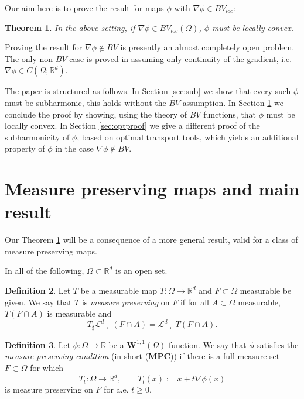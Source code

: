 \documentclass[11pt, twoside, reqno]{amsart}
\newcounter{assu}
\theoremstyle{definition} \newtheorem{definition}{Definition}[section]
\theoremstyle{definition} \newtheorem{remark}[definition]{Remark}
\theoremstyle{plain} \newtheorem{lemma}[definition]{Lemma}
\theoremstyle{plain} \newtheorem{proposition}[definition]{Proposition}
\theoremstyle{plain} \newtheorem{theorem}[definition]{Theorem}
\theoremstyle{plain} \newtheorem{corollary}[definition]{Corollary}
\theoremstyle{definition} \newtheorem{example}[definition]{Example}
\theoremstyle{plain} \newtheorem{claim}[clai]{Claim}
\theoremstyle{definition} \newtheorem{assumption}[definition]{Assumption}
\newcommand{\1}{\mathbbm 1}
\numberwithin{equation}{section} %
\theoremstyle{plain} \newtheorem*{theorem*}{Theorem}
\theoremstyle{plain} \newtheorem{mthm}[maintheorem]{Main Theorem}
\theoremstyle{plain} \newtheorem*{mthm*}{Main Theorem}
\theoremstyle{plain} \newtheorem*{conjecture*}{Conjecture}
\theoremstyle{plain} \newtheorem{conjecture}[definition]{Conjecture}
\theoremstyle{plain} \newtheorem*{problem*}{Problem}
\begin{document}
\vspace{0.3cm}
Our aim here is to prove the result for maps $\phi$ with $\nabla \phi \in BV_{loc}$:
\begin{theorem}\label{thm:mainthm}
    In the above setting, if $\nabla \phi \in BV_{loc}(\Omega)$, $\phi$ must be locally convex.
\end{theorem}

\vspace{0.3cm}
Proving the result for $\nabla \phi \notin BV$ is presently an almost completely open problem. The only non-$BV$ case is proved in \cite{LP25} assuming only continuity of the gradient, i.e. $\nabla \phi \in C(\Omega; \mathbb R^d)$.

\vspace{0.3cm}
The paper is structured as follows. In Section \ref{sec:sub} we show that every such $\phi$ must be subharmonic, this holds without the $BV$ assumption.  In Section \ref{sec:main} we conclude the proof by showing, using the theory of $BV$ functions, that $\phi$ must be locally convex. In Section \ref{sec:optproof} we give a different proof of the subharmonicity of $\phi$, based on optimal transport tools, which yields an additional property of $\phi$ in the case $\nabla \phi \notin BV$.

\section{Measure preserving maps and main result}\label{sec:main}
Our Theorem \ref{thm:mainthm} will be a consequence of a more general result, valid for a class of measure preserving maps.

In all of the following,  $\Omega \subset \mathbb R^d$ is an open set.

\begin{definition}
Let $T$ be a measurable map $T : \Omega \to \mathbb R^d$ and $F \subset \Omega$ measurable be given. We say that $T$ is \emph{measure preserving} on $F$ if for all $A\subset \Omega$ measurable, $T(F \cap A)$ is measurable and
\begin{equation}\label{eq:mp}
    T_\sharp \mathscr L^d \llcorner (F\cap A) = \mathscr L^d \llcorner T(F\cap A).
\end{equation}
\end{definition}

\vspace{0.3cm}
\begin{definition}\label{defi:mpc}
    Let $\phi : \Omega \to \mathbb R$ be a $\mathbf W^{1,1}(\Omega)$ function. We say that $\phi$ satisfies the \emph{measure preserving condition} (in short (\textbf{MPC})) if there is a full measure set  $F \subset \Omega$ for which
\begin{equation}\label{def:Ttmp}
    T_t : \Omega \to \mathbb R^d, \qquad T_t(x) := x + t \nabla \phi(x)
\end{equation}
is measure preserving on $F$ for a.e. $t \geq 0$.
\end{definition}
\end{document}

